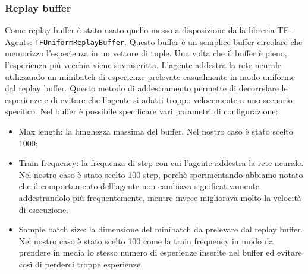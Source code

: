\documentclass[conference]{IEEEtran}
\newcommand{\code}[1]{\texttt{#1}}
\begin{document}
\subsubsection{Replay buffer}
Come replay buffer è stato usato quello messo a disposizione dalla libreria TF-Agents: \code{TFUniformReplayBuffer}. Questo buffer è un semplice buffer circolare che memorizza l'esperienza in un vettore di tuple. Una volta che il buffer è pieno, l'esperienza più vecchia viene sovrascritta. L'agente addestra la rete neurale utilizzando un minibatch di esperienze prelevate casualmente in modo uniforme dal replay buffer. Questo metodo di addestramento permette di decorrelare le esperienze e di evitare che l'agente si adatti troppo velocemente a uno scenario specifico. Nel buffer è possibile specificare vari parametri di configurazione:
\begin{itemize}
    \item Max length: la lunghezza massima del buffer. Nel nostro caso è stato scelto 1000;
    \item Train frequency: la frequenza di step con cui l'agente addestra la rete neurale. Nel nostro caso è stato scelto 100 step, perchè sperimentando abbiamo notato che il comportamento dell'agente non cambiava significativamente addestrandolo più frequentemente, mentre invece migliorava molto la velocità di esecuzione.
    \item Sample batch size: la dimensione del minibatch da prelevare dal replay buffer. Nel nostro caso è stato scelto 100 come la train frequency in modo da prendere in media lo stesso numero di esperienze inserite nel buffer ed evitare così di perderci troppe esperienze.
\end{itemize}
\end{document}
